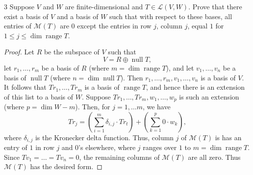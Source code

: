 \documentclass[11pt]{extarticle}
\newenvironment{problem}[1]{\begin{prob*}{#1}{}}{\end{prob*}}
\newcommand{\mat}{\mathcal{M}}
\newcommand{\Hom}{\mathcal{L}}
\DeclareMathOperator{\Null}{null}
\DeclareMathOperator{\Range}{range}
\begin{document}
\begin{problem}{3}
Suppose $V$ and $W$ are finite-dimensional and $T\in\Hom(V,W)$.  Prove that there exist a basis of $V$ and a basis of $W$ such that with respect to these bases, all entries of $\mat(T)$ are $0$ except the entries in row $j$, column $j$, equal $1$ for $1\leq j\leq \dim\Range T$.  
\end{problem}
\begin{proof}
Let $R$ be the subspace of $V$ such that 
\begin{equation*}
V = R\oplus \Null T,
\end{equation*}
let $r_1,\dots, r_m$ be a basis of $R$ (where $m =\dim\Range T$), and let $v_1,\dots, v_n$ be a basis of $\Null T$ (where $n = \dim\Null T$).  Then $r_1,\dots, r_m, v_1,\dots,v_n$ is a basis of $V$.  It follows that $Tr_1,\dots, Tr_m$ is a basis of $\Range T$, and hence there is an extension of this list to a basis of $W$.  Suppose $Tr_1,\dots, Tr_m, w_1,\dots, w_p$ is such an extension (where $p = \dim W - m$).  Then, for $j = 1,\dots m$, we have
\begin{equation*}
Tr_j = \left(\sum_{i = 1}^m\delta_{i,j}\cdot Tr_t\right) + \left(\sum_{k = 1}^p 0\cdot w_k\right),
\end{equation*}
where $\delta_{i,j}$ is the Kronecker delta function.  Thus, column $j$ of $\mat(T)$ is has an entry of $1$ in row $j$ and $0$'s elsewhere, where $j$ ranges over $1$ to $m = \dim\Range T$.  Since $Tv_1 = \dots = Tv_n = 0$, the remaining columns of $\mat(T)$ are all zero.  Thus $\mat(T)$ has the desired form.
\end{proof}
\end{document}
